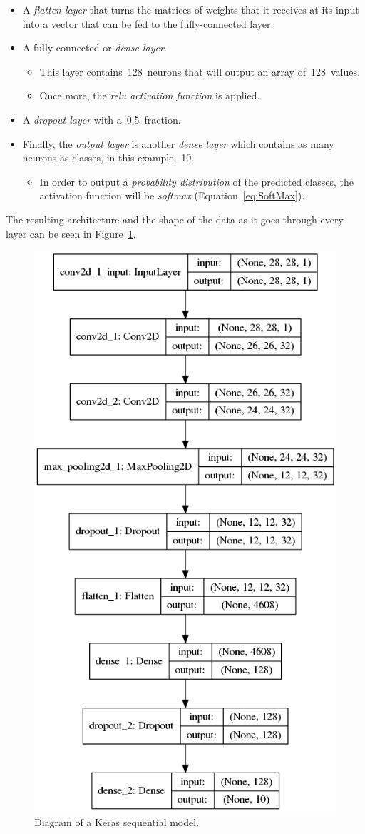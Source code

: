 \begin{itemize}
	\item A \emph{flatten layer} that turns the matrices of weights that it receives at its input into a vector that can be fed to the fully-connected layer.
	\item A fully-connected or \emph{dense layer}.
	\begin{itemize}
		\item This layer contains~128~neurons that will output an array of~128~values.
		\item Once more, the \emph{\gls{relu} activation function} is applied.
	\end{itemize} 
	
	\item A \emph{dropout layer} with a~0.5~fraction.
	
	\item Finally, the \emph{output layer} is another \emph{dense layer} which contains as many neurons as classes, in this example,~10. 
	\begin{itemize}
		\item In order to output a \emph{probability distribution} of the predicted classes, the activation function will be \emph{softmax} (Equation~\ref{eq:SoftMax}).
	\end{itemize}
\end{itemize}

The resulting architecture and the shape of the data as it goes through every layer can be seen in Figure~\ref{fig:model}.

\begin{figure}
	\centering
	\includegraphics[width=0.6\linewidth, keepaspectratio]{figures/model.png}
	\caption{Diagram of a Keras sequential model.}
	\label{fig:model}
\end{figure}

